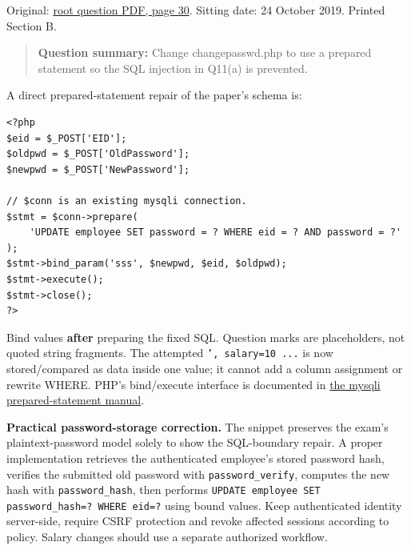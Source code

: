 \documentclass[11pt,a4paper]{article}
\begin{document}
Original: \href{../../CSE405-Security_Merged.pdf\#page=30}{root question PDF,\allowbreak{} page 30}. Sitting date: 24 October 2019. Printed Section B.



\begin{quote}\small

\textbf{Question summary:} Change changepasswd.\allowbreak{}php to use a prepared statement so the SQL injection in Q11(a) is prevented.



\end{quote}

A direct prepared-statement repair of the paper’s schema is:



\begin{Verbatim}[breaklines=true,breakanywhere=true,fontsize=\small,frame=single,rulecolor=\color{PanelBorder}]
<?php
$eid = $_POST['EID'];
$oldpwd = $_POST['OldPassword'];
$newpwd = $_POST['NewPassword'];

// $conn is an existing mysqli connection.
$stmt = $conn->prepare(
    'UPDATE employee SET password = ? WHERE eid = ? AND password = ?'
);
$stmt->bind_param('sss', $newpwd, $eid, $oldpwd);
$stmt->execute();
$stmt->close();
?>
\end{Verbatim}

Bind values \textbf{after} preparing the fixed SQL. Question marks are placeholders,\allowbreak{} not quoted string fragments. The attempted \texttt{',\allowbreak{} salary=\allowbreak{}10 ...} is now stored/\allowbreak{}compared as data inside one value; it cannot add a column assignment or rewrite WHERE. PHP’s bind/\allowbreak{}execute interface is documented in \href{https://www.php.net/manual/en/mysqli.quickstart.prepared-statements.php}{the mysqli prepared-statement manual}.


\textbf{Practical password-storage correction.} The snippet preserves the exam’s plaintext-password model solely to show the SQL-boundary repair. A proper implementation retrieves the authenticated employee’s stored password hash,\allowbreak{} verifies the submitted old password with \texttt{password\_verify},\allowbreak{} computes the new hash with \texttt{password\_hash},\allowbreak{} then performs \texttt{UPDATE employee SET password\_hash=\allowbreak{}? WHERE eid=\allowbreak{}?} using bound values. Keep authenticated identity server-side,\allowbreak{} require CSRF protection and revoke affected sessions according to policy. Salary changes should use a separate authorized workflow.
\end{document}
